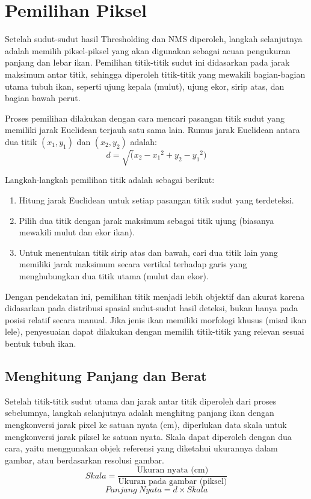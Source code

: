 \section{Pemilihan Piksel}
    Setelah sudut-sudut hasil Thresholding dan NMS diperoleh, langkah selanjutnya adalah memilih piksel-piksel yang akan digunakan sebagai acuan pengukuran panjang dan lebar ikan. Pemilihan titik-titik sudut ini didasarkan pada jarak maksimum antar titik, sehingga diperoleh titik-titik yang mewakili bagian-bagian utama tubuh ikan, seperti ujung kepala (mulut), ujung ekor, sirip atas, dan bagian bawah perut.

    Proses pemilihan dilakukan dengan cara mencari pasangan titik sudut yang memiliki jarak Euclidean terjauh satu sama lain. Rumus jarak Euclidean antara dua titik \((x_1, y_1)\) dan \((x_2, y_2)\) adalah:
\begin{equation}
    d = \sqrt({x_2 - x_1}^2 + {y_2 - y_1}^2)
\end{equation}

    Langkah-langkah pemilihan titik adalah sebagai berikut:
\begin{enumerate}
    \item Hitung jarak Euclidean untuk setiap pasangan titik sudut yang terdeteksi.
    \item Pilih dua titik dengan jarak maksimum sebagai titik ujung (biasanya mewakili mulut dan ekor ikan).
    \item Untuk menentukan titik sirip atas dan bawah, cari dua titik lain yang memiliki jarak maksimum secara vertikal terhadap garis yang menghubungkan dua titik utama (mulut dan ekor).
\end{enumerate}

    Dengan pendekatan ini, pemilihan titik menjadi lebih objektif dan akurat karena didasarkan pada distribusi spasial sudut-sudut hasil deteksi, bukan hanya pada posisi relatif secara manual. Jika jenis ikan memiliki morfologi khusus (misal ikan lele), penyesuaian dapat dilakukan dengan memilih titik-titik yang relevan sesuai bentuk tubuh ikan.
\subsection{Menghitung Panjang dan Berat}
    Setelah titik-titik sudut utama dan jarak antar titik diperoleh dari proses sebelumnya, langkah selanjutnya adalah menghitng panjang ikan dengan mengkonversi jarak pixel ke satuan nyata (cm), diperlukan data skala untuk mengkonversi jarak piksel ke satuan nyata. Skala dapat diperoleh dengan dua cara, yaitu menggunakan objek referensi yang diketahui ukurannya dalam gambar, atau berdasarkan resolusi gambar.
\begin{equation*}
    Skala = \frac{\text{Ukuran nyata (cm)}}{\text{Ukuran pada gambar (piksel)}}
\end{equation*}
\begin{equation}
    Panjang\ Nyata = d \times Skala
\end{equation}

